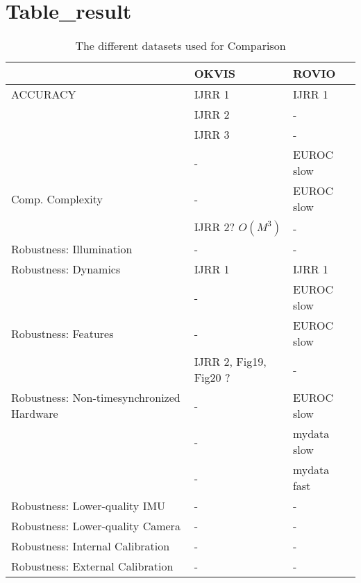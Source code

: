 \chapter*{Table_result}

\begin{table}[ht]
\centering
\begin{tabular}{|p{7.0cm}|p{2.5cm}|p{2.5cm}|}
\hline
 & OKVIS & ROVIO \\
\hline\hline
ACCURACY & IJRR 1 & IJRR 1 \\
 & IJRR 2 & - \\
 & IJRR 3 & - \\
 & - & EUROC slow \\
\hline\hline
Comp. Complexity & - & EUROC slow \\
& IJRR 2? $O(M^3)$ & - \\
\hline\hline
Robustness: Illumination & - & - \\
\hline
Robustness: Dynamics & IJRR 1 & IJRR 1 \\
 & - & EUROC slow \\
\hline
Robustness: Features & - & EUROC slow \\
 & IJRR 2, Fig19, Fig20 ? & - \\
\hline
Robustness: Non-timesynchronized Hardware & - & EUROC slow \\
 & - & mydata slow \\
 & - & mydata fast \\
\hline
Robustness: Lower-quality IMU & - & - \\
\hline
Robustness: Lower-quality Camera & - & - \\
\hline
Robustness: Internal Calibration & - & - \\
\hline
Robustness: External Calibration & - & - \\
\hline

\end{tabular}
\caption{The different datasets used for Comparison}
\label{table:comparison}
\end{table}

